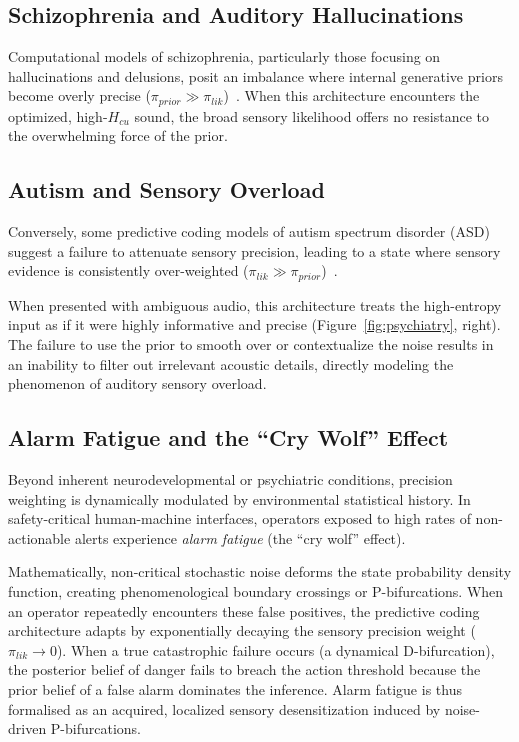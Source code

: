 \documentclass[conference]{IEEEtran}
\begin{document}
\subsection{Schizophrenia and Auditory Hallucinations}
Computational models of schizophrenia, particularly those focusing on hallucinations and delusions, posit an imbalance where internal generative priors become overly precise ($\pi_{prior} \gg \pi_{lik}$)~\cite{b3}. When this architecture encounters the optimized, high-$H_{cu}$ sound, the broad sensory likelihood offers no resistance to the overwhelming force of the prior. 

\subsection{Autism and Sensory Overload}
Conversely, some predictive coding models of autism spectrum disorder (ASD) suggest a failure to attenuate sensory precision, leading to a state where sensory evidence is consistently over-weighted ($\pi_{lik} \gg \pi_{prior}$)~\cite{b4}. 

When presented with ambiguous audio, this architecture treats the high-entropy input as if it were highly informative and precise (Figure~\ref{fig:psychiatry}, right). The failure to use the prior to smooth over or contextualize the noise results in an inability to filter out irrelevant acoustic details, directly modeling the phenomenon of auditory sensory overload.

\subsection{Alarm Fatigue and the ``Cry Wolf'' Effect}
Beyond inherent neurodevelopmental or psychiatric conditions, precision weighting is dynamically modulated by environmental statistical history. In safety-critical human-machine interfaces, operators exposed to high rates of non-actionable alerts experience \emph{alarm fatigue} (the ``cry wolf'' effect). 

Mathematically, non-critical stochastic noise deforms the state probability density function, creating phenomenological boundary crossings or P-bifurcations. When an operator repeatedly encounters these false positives, the predictive coding architecture adapts by exponentially decaying the sensory precision weight ($\pi_{lik} \to 0$). When a true catastrophic failure occurs (a dynamical D-bifurcation), the posterior belief of danger fails to breach the action threshold because the prior belief of a false alarm dominates the inference. Alarm fatigue is thus formalised as an acquired, localized sensory desensitization induced by noise-driven P-bifurcations.
\end{document}
